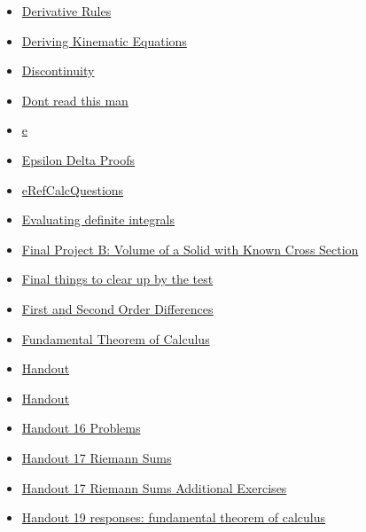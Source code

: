 \documentclass[11pt]{article}
\begin{document}
\begin{itemize}
\begin{itemize}
\begin{itemize}
\item \href{mathematics/single\_variable\_calculus/KBrefDerivativeRules.org}{Derivative Rules}
\item \href{mathematics/single\_variable\_calculus/KBrefDerivingKinematicEquations.org}{Deriving Kinematic Equations}
\item \href{mathematics/single\_variable\_calculus/KBhMATH401Discontinuity.org}{Discontinuity}
\item \href{mathematics/single\_variable\_calculus/KBtestreflectionquestionhuxley.org}{Dont read this man}
\item \href{mathematics/single\_variable\_calculus/KbhMATH401e.org}{e}
\item \href{mathematics/single\_variable\_calculus/KbhMATH401EpsilonDeltaProofs.org}{Epsilon Delta Proofs}
\item \href{mathematics/single\_variable\_calculus/eRefCalcQuestions.org}{eRefCalcQuestions}
\item \href{mathematics/single\_variable\_calculus/KBe21math401retHandout24EvaluatingDefiniteIntegrals.org}{Evaluating definite integrals}
\item \href{mathematics/single\_variable\_calculus/KBe21math401retCrossSectionSolidExample.org}{Final Project B: Volume of a Solid with Known Cross Section}
\item \href{mathematics/single\_variable\_calculus/KBhMATH401APCalc.org}{Final things to clear up by the test}
\item \href{mathematics/single\_variable\_calculus/KBhMATH401FirstAndSecondOrder.org}{First and Second Order Differences}
\item \href{mathematics/single\_variable\_calculus/KBrefFundamentalTheoremOfCalculus.org}{Fundamental Theorem of Calculus}
\item \href{mathematics/single\_variable\_calculus/KBdHandout4p2.org}{Handout}
\item \href{mathematics/single\_variable\_calculus/KBdHandout4p1.org}{Handout}
\item \href{mathematics/single\_variable\_calculus/KBe21math401retHandout16TaylorSeries.org}{Handout 16 Problems}
\item \href{mathematics/single\_variable\_calculus/KBe21math401retHandout17RiemannSums.org}{Handout 17 Riemann Sums}
\item \href{mathematics/single\_variable\_calculus/KBe21math401retHandout17AdditionalExercises.org}{Handout 17 Riemann Sums Additional Exercises}
\item \href{mathematics/single\_variable\_calculus/KBe21math401retHandout19FundamentalTheoremCalculus.org}{Handout 19 responses: fundamental theorem of calculus}

\end{itemize}
\end{itemize}
\end{itemize}
\end{document}
